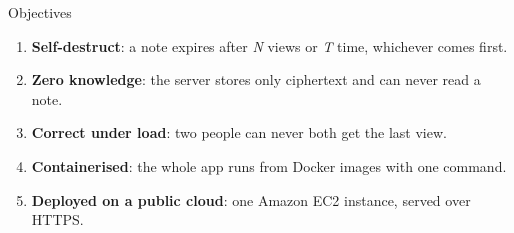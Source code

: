 \documentclass[aspectratio=169,11pt]{beamer}
\newcommand{\hl}[1]{\textcolor{cobalt}{\textbf{#1}}}
\begin{document}
\begin{frame}{Objectives}
  \begin{enumerate}
    \item \hl{Self-destruct}: a note expires after \emph{N} views or \emph{T} time, whichever comes first.
    \item \hl{Zero knowledge}: the server stores only ciphertext and can never read a note.
    \item \hl{Correct under load}: two people can never both get the last view.
    \item \hl{Containerised}: the whole app runs from Docker images with one command.
    \item \hl{Deployed on a public cloud}: one Amazon EC2 instance, served over HTTPS.
  \end{enumerate}
\end{frame}

\end{document}
